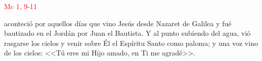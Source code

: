 \hfill\textcolor{red}{Mc 1, 9-11}

aconteció por aquellos días que vino Jesús desde Nazaret de Galilea y fué bautizado en el Jordán por Juan el Bautista.
Y al punto subiendo del agua, vió rasgarse los cielos y venir sobre Él el Espíritu Santo como paloma; y una voz vino de los cielos: 
<<Tú eres mi Hijo amado, en Ti me agradé>>.
